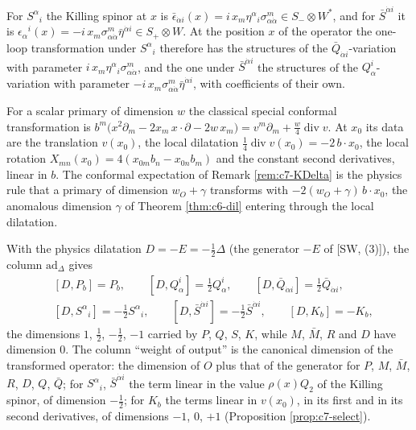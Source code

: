 \begin{remark}
For $S^\alpha{}_i$ the Killing spinor at $x$ is $\bar\epsilon_{\dot\alpha i}(x)=i\,x_m\eta^\alpha{}_i\sigma^m_{\alpha\dot\alpha}\in S_-\otimes W^*$, and for $\bar S^{\dot\alpha i}$ it is $\epsilon_\alpha{}^i(x)=-i\,x_m\sigma^m_{\alpha\dot\alpha}\bar\eta^{\dot\alpha i}\in S_+\otimes W$. At the position $x$ of the operator the one-loop transformation under $S^\alpha{}_i$ therefore has the structures of the $\bar Q_{\dot\alpha i}$-variation with parameter $i\,x_m\eta^\alpha{}_i\sigma^m_{\alpha\dot\alpha}$, and the one under $\bar S^{\dot\alpha i}$ the structures of the $Q^i_\alpha$-variation with parameter $-i\,x_m\sigma^m_{\alpha\dot\alpha}\bar\eta^{\dot\alpha i}$, with coefficients of their own.
\end{remark}

\begin{remark}
For a scalar primary of dimension $w$ the classical special conformal transformation is $b^m\big(x^2\partial_m-2x_m\,x\cdot\partial-2w\,x_m\big)=v^m\partial_m+\tfrac w4\operatorname{div}v$. At $x_0$ its data are the translation $v(x_0)$, the local dilatation $\tfrac14\operatorname{div}v(x_0)=-2\,b\cdot x_0$, the local rotation $X_{mn}(x_0)=4(x_{0m}b_n-x_{0n}b_m)$ and the constant second derivatives, linear in $b$. The conformal expectation of Remark \ref{rem:c7-KDelta} is the physics rule that a primary of dimension $w_O+\gamma$ transforms with $-2(w_O+\gamma)\,b\cdot x_0$, the anomalous dimension $\gamma$ of Theorem \ref{thm:c6-dil} entering through the local dilatation.
\end{remark}

\begin{remark}
With the physics dilatation $D=-E=-\tfrac12\Delta$ (the generator $-E$ of [SW, (3)]), the column $\mathrm{ad}_\Delta$ gives
\[
\begin{aligned}&[D,P_b]=P_b,\qquad [D,Q^i_\alpha]=\tfrac12Q^i_\alpha,\qquad [D,\bar Q_{\dot\alpha i}]=\tfrac12\bar Q_{\dot\alpha i},\\ &[D,S^\alpha{}_i]=-\tfrac12S^\alpha{}_i,\qquad [D,\bar S^{\dot\alpha i}]=-\tfrac12\bar S^{\dot\alpha i},\qquad [D,K_b]=-K_b,\end{aligned}
\]
the dimensions $1$, $\tfrac12$, $-\tfrac12$, $-1$ carried by $P$, $Q$, $S$, $K$, while $M$, $\bar M$, $R$ and $D$ have dimension $0$. The column ``weight of output'' is the canonical dimension of the transformed operator: the dimension of $O$ plus that of the generator for $P$, $M$, $\bar M$, $R$, $D$, $Q$, $\bar Q$; for $S^\alpha{}_i$, $\bar S^{\dot\alpha i}$ the term linear in the value $\rho(x)Q_2$ of the Killing spinor, of dimension $-\tfrac12$; for $K_b$ the terms linear in $v(x_0)$, in its first and in its second derivatives, of dimensions $-1$, $0$, $+1$ (Proposition \ref{prop:c7-select}).
\end{remark}

